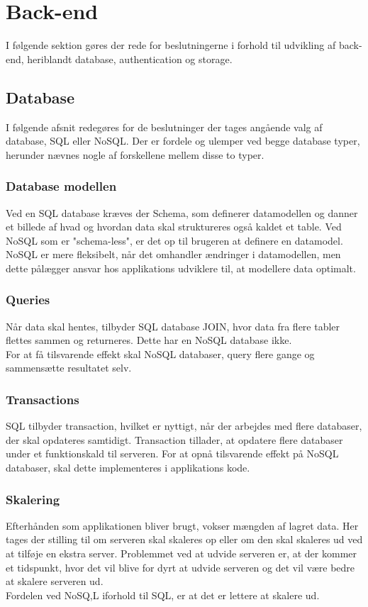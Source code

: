 \section{Back-end}
I følgende sektion gøres der rede for beslutningerne i forhold til udvikling af back-end, heriblandt database, authentication og storage.

\subsection{Database}
I følgende afsnit redegøres for de beslutninger der tages angående valg af database, SQL\cite{SQL} eller NoSQL\cite{NoSQL}.
Der er fordele og ulemper ved begge database typer, herunder nævnes nogle af forskellene mellem disse to typer.

\subsubsection{Database modellen}

Ved en SQL database kræves der Schema\cite{Schema}, som definerer datamodellen og danner et billede af hvad og hvordan data skal struktureres også kaldet et table. Ved NoSQL som er "schema-less", er det op til brugeren at definere en datamodel. NoSQL er mere fleksibelt, når det omhandler ændringer i datamodellen, men dette pålægger ansvar hos applikations udviklere til, at modellere data optimalt.

\subsubsection{Queries\cite{Query}}
Når data skal hentes, tilbyder SQL database JOIN\cite{JOIN}, hvor data fra flere tabler flettes sammen og returneres. Dette har en NoSQL database ikke. \\
For at få tilsvarende effekt skal NoSQL databaser, query flere gange og sammensætte resultatet selv.

\subsubsection{Transactions\cite{Transactions}}
 SQL tilbyder transaction, hvilket er nyttigt, når der arbejdes med flere databaser, der skal opdateres samtidigt. Transaction tillader, at opdatere flere databaser under et funktionskald til serveren. For at opnå tilsvarende effekt på NoSQL databaser, skal dette implementeres i applikations kode. 

\subsubsection{Skalering}
Efterhånden som applikationen bliver brugt, vokser mængden af lagret data. Her tages der stilling til om serveren skal skaleres op eller om den skal skaleres ud ved at tilføje en ekstra server. Problemmet ved at udvide serveren er, at der kommer et tidspunkt, hvor det vil blive for dyrt at udvide serveren og det vil være bedre at skalere serveren ud. \\
Fordelen ved NoSQ,L iforhold til SQL, er at det er lettere at skalere ud. 

